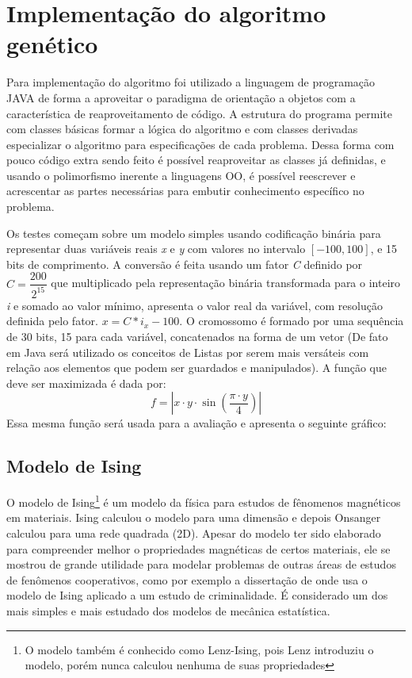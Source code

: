 
\chapter{Implementação do algoritmo genético}
\label{chap:implementGA}

Para implementação do algoritmo foi utilizado a linguagem de programação JAVA de forma a aproveitar o paradigma de orientação a objetos com a característica de reaproveitamento de código. A estrutura do programa permite com classes básicas formar a lógica do algoritmo e com classes derivadas especializar o algoritmo para especificações de cada problema. Dessa forma com pouco código extra sendo feito é possível reaproveitar as classes já definidas, e usando o polimorfismo inerente a linguagens OO, é possível reescrever e acrescentar as partes necessárias para embutir conhecimento específico no problema.

Os testes começam sobre um modelo simples usando codificação binária para representar duas variáveis reais \textit{x} e \textit{y} com valores no intervalo \([-100,100]\), e 15 bits de comprimento. A conversão é feita usando um fator \textit{C} definido por \(C = \dfrac{200}{2^15}\) que multiplicado pela representação binária transformada para o inteiro \textit{i} e somado ao valor mínimo, apresenta o valor real da variável, com resolução definida pelo fator.
\(x = C * i_x - 100\). O cromossomo é formado por uma sequência de 30 bits, 15 para cada variável, concatenados na forma de um vetor (De fato em Java será utilizado os conceitos de Listas por serem mais versáteis com relação aos elementos que podem ser guardados e manipulados). A função que deve ser maximizada é dada por: 
\[f = \left| x \cdot y \cdot \sin\left(\frac{\pi \cdot y}{4}\right) \right|\]
Essa mesma função será usada para a avaliação e apresenta o seguinte gráfico:


\section{Modelo de Ising}

O modelo de Ising\footnote{O modelo também é conhecido como Lenz-Ising, pois Lenz introduziu o modelo, porém nunca calculou nenhuma de suas propriedades} é um modelo da física para estudos de fênomenos magnéticos em materiais. Ising calculou o modelo para uma dimensão e depois Onsanger calculou para uma rede quadrada (2D). Apesar do modelo ter sido elaborado para compreender melhor o propriedades magnéticas de certos materiais, ele se mostrou de grande utilidade para modelar problemas de outras áreas de estudos de fenômenos cooperativos, como por exemplo a dissertação de \cite{Lucena2014} onde usa o modelo de Ising aplicado a um estudo de criminalidade. É considerado um dos mais simples e mais estudado dos modelos de mecânica estatística.


